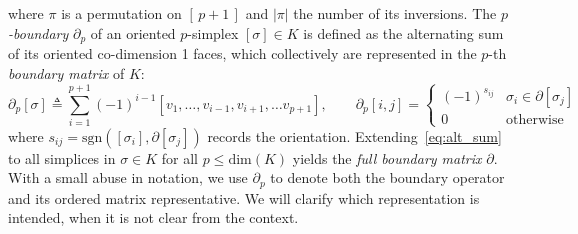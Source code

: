 where $\pi$ is a permutation on $[\,p+1\,]$ and $\lvert \pi \rvert$ the number of its inversions. 
The \emph{$p$-boundary} $\partial_p$ of an oriented $p$-simplex $[\sigma] \in K$ is defined as the alternating sum of its oriented co-dimension 1 faces, which collectively are represented in the $p$-th \emph{boundary matrix} of $K$:
\begin{equation}\label{eq:alt_sum}
	\partial_p[\sigma] \triangleq \sum_{i=1}^{p+1} (-1)^{i-1} [v_1, \dots, v_{i-1}, v_{i+1}, \dots v_{p+1}], \quad \quad  
		\partial_p[i,j] = \begin{cases}
		(-1)^{s_{ij}} & \sigma_i \in \partial[\sigma_j]  \\
		0 & \text{otherwise}
	\end{cases}
\end{equation}
where $s_{ij} = \mathrm{sgn}([\sigma_i], \partial [\sigma_j])$ records the orientation. Extending~\eqref{eq:alt_sum} to all simplices in $\sigma \in K$ for all $p \leq \mathrm{dim}(K)$ yields the \emph{full boundary matrix} $\partial$. 
With a small abuse in notation, we use $\partial_p$ to denote both the boundary operator and its ordered matrix representative. We will clarify which representation is intended, when it is not clear from the context. 

